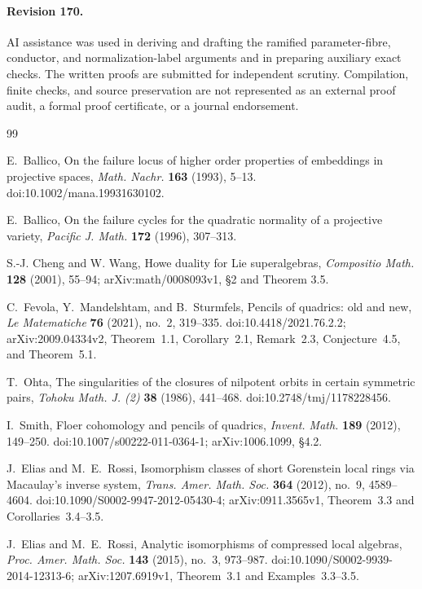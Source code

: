 \documentclass[11pt,reqno]{amsart}
\numberwithin{equation}{section}
\theoremstyle{definition}\newtheorem{definition}[theorem]{Definition}
\theoremstyle{remark}\newtheorem{remark}[theorem]{Remark}
\begin{document}
\paragraph{Revision 170.}
AI assistance was used in deriving and drafting the ramified parameter-fibre,
conductor, and normalization-label arguments and in preparing auxiliary
exact checks. The written proofs are submitted for independent scrutiny.
Compilation, finite checks, and source preservation are not represented as
an external proof audit, a formal proof certificate, or a journal endorsement.

\begin{thebibliography}{99}

E.~Ballico,
On the failure locus of higher order properties of embeddings in
projective spaces,
\emph{Math. Nachr.} \textbf{163} (1993), 5--13.
doi:10.1002/mana.19931630102.

E.~Ballico,
On the failure cycles for the quadratic normality of a projective
variety,
\emph{Pacific J. Math.} \textbf{172} (1996), 307--313.

S.-J. Cheng and W. Wang, Howe duality for Lie superalgebras,
\emph{Compositio Math.} \textbf{128} (2001), 55--94;
arXiv:math/0008093v1, \S2 and Theorem 3.5.

C.~Fevola, Y.~Mandelshtam, and B.~Sturmfels,
Pencils of quadrics: old and new,
\emph{Le Matematiche} \textbf{76} (2021), no.~2, 319--335.
doi:10.4418/2021.76.2.2; arXiv:2009.04334v2,
Theorem~1.1, Corollary~2.1, Remark~2.3, Conjecture~4.5, and Theorem~5.1.

T.~Ohta, The singularities of the closures of nilpotent orbits in certain
symmetric pairs, \emph{Tohoku Math. J. (2)} \textbf{38} (1986), 441--468.
doi:10.2748/tmj/1178228456.

I.~Smith, Floer cohomology and pencils of quadrics,
\emph{Invent. Math.} \textbf{189} (2012), 149--250.
doi:10.1007/s00222-011-0364-1; arXiv:1006.1099, \S4.2.

J.~Elias and M.~E.~Rossi,
Isomorphism classes of short Gorenstein local rings via Macaulay's
inverse system,
\emph{Trans. Amer. Math. Soc.} \textbf{364} (2012), no.~9, 4589--4604.
doi:10.1090/S0002-9947-2012-05430-4;
arXiv:0911.3565v1, Theorem~3.3 and Corollaries~3.4--3.5.

J.~Elias and M.~E.~Rossi,
Analytic isomorphisms of compressed local algebras,
\emph{Proc. Amer. Math. Soc.} \textbf{143} (2015), no.~3, 973--987.
doi:10.1090/S0002-9939-2014-12313-6;
arXiv:1207.6919v1, Theorem~3.1 and Examples~3.3--3.5.


\end{thebibliography}
\end{document}
